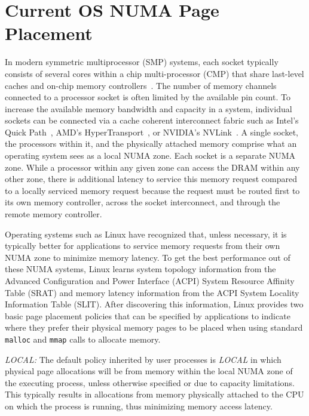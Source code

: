 \section{Current OS NUMA Page Placement}
\label{linux_background}
In modern symmetric multiprocessor (SMP) systems, each socket typically consists
of several {\color{black}cores} within a chip multi-processor (CMP) that share
last-level caches and on-chip memory controllers~\cite{INTELXEON}. The number of
memory channels connected to a processor socket is often limited by the
available pin count.  To increase the available memory bandwidth and capacity in
a system, individual sockets can be connected via a cache coherent interconnect
fabric such as Intel's Quick Path~\cite{INTELQPI}, AMD's
HyperTransport~\cite{AMDHT}, or NVIDIA's NVLink~\cite{NVLINK}.  A single socket,
the processors within it, and the physically attached memory comprise what an
operating system sees as a local NUMA zone.  Each socket is a separate NUMA
zone. While a processor within any given zone can access the DRAM within any
other zone, there is additional latency to service this memory request compared
to a locally serviced memory request because the request must be routed first to
its own memory controller, across the socket interconnect, and through the
remote memory controller.

Operating systems such as Linux have recognized that, unless necessary, it is
typically better for applications to service memory requests from their own NUMA
zone to minimize memory latency.  To get the best performance out of these NUMA
systems, Linux learns system topology information from the Advanced
Configuration and Power Interface (ACPI) System Resource Affinity Table (SRAT)
and memory latency information from the ACPI System Locality Information Table
(SLIT)\@. After discovering this information, Linux provides two basic page
placement policies that can be specified by applications to indicate where they
prefer their physical memory pages to be placed when using standard {\tt malloc}
and {\tt mmap} calls to allocate memory.

\emph{LOCAL:} The default policy inherited by user processes is \emph{LOCAL} in
which physical page allocations will be from memory within the local NUMA zone
of the executing process, unless otherwise specified or due to capacity
limitations.  This typically results in allocations from memory physically
attached to the CPU on which the process is running, thus minimizing memory
access latency.

